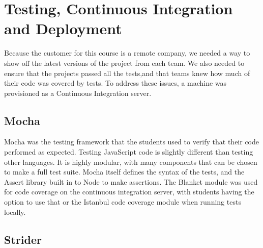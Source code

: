 \documentclass[12pt]{article}
\begin{document}
\section{Testing, Continuous Integration and Deployment}\label{sec:CI}
Because the customer for this course is a remote company, we needed a way to show off the latest versions of the project from each team. We also needed to ensure that the projects passed all the tests,and that teams knew how much of their code was covered by tests. To address these issues, a machine was provisioned as a Continuous Integration server. 

\subsection{Mocha}\label{sec:mocha}
Mocha was the testing framework that the students used to verify that their code performed as expected. Testing JavaScript code is slightly different than testing other languages. It is highly modular, with many components that can be chosen to make a full test suite. Mocha itself defines the syntax of the tests, and the Assert library built in to Node to make assertions. The Blanket module was used for code coverage on the continuous integration server, with students having the option to use that or the Istanbul code coverage module when running tests locally.


\subsection{Strider}\label{sec:strider}





%
%




%  
%
%


\end{document}
